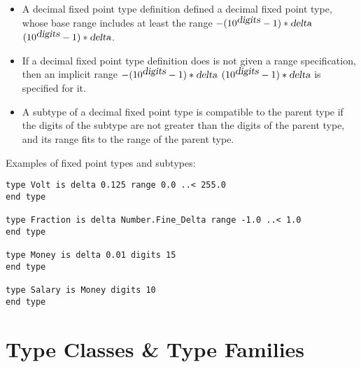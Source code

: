 \begin{itemize}
  \item[] A decimal fixed point type definition defined a decimal fixed point type, whose base range includes at least the range $-(10^{\mbox{\sl digits}}-1)*\mbox{\sl delta}$  $(10^{\mbox{\sl digits}}-1)*\mbox{\sl delta}$. 
  \item[] If a decimal fixed point type definition does is not given a range specification, then an implicit range $-(10^{\mbox{\sl digits}}-1)*\mbox{\sl delta}$  $(10^{\mbox{\sl digits}}-1)*\mbox{\sl delta}$ is specified for it. 
  \item[] A subtype of a decimal fixed point type is compatible to the parent type if the digits of the subtype are not greater than the digits of the parent type, and its range fits to the range of the parent type. 
\end{itemize}

\example Examples of fixed point types and subtypes:
\begin{lstlisting}
type Volt is delta 0.125 range 0.0 ..< 255.0 
end type

type Fraction is delta Number.Fine_Delta range -1.0 ..< 1.0 
end type

type Money is delta 0.01 digits 15 
end type

type Salary is Money digits 10 
end type
\end{lstlisting}





\section{Type Classes \& Type Families}
\label{sec:type-classes}


